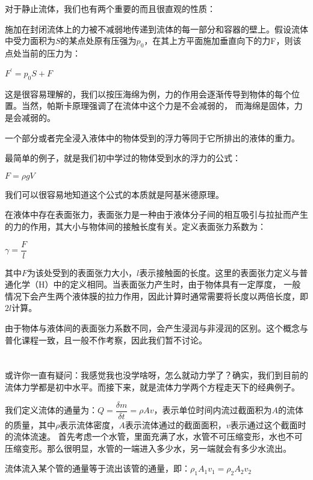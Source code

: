         对于静止流体，我们也有两个重要的而且很直观的性质：
        \begin{law}
            施加在封闭流体上的力被不减弱地传递到流体的每一部分和容器的壁上。假设流体中受力面积为$S$的某点处原有压强为$p_0$，在其上方平面施加垂直向下的力F，则该点处当前的压力为：
            \begin{center}
                $F^{'}=p_0 S +F$
            \end{center}
        \end{law}

        这是很容易理解的，我们以按压海绵为例，力的作用会逐渐传导到物体的每个位置。当然，帕斯卡原理强调了在流体中这个力是不会减弱的，
        而海绵是固体，力是会减弱的。
        \begin{law}
            一个部分或者完全浸入液体中的物体受到的浮力等同于它所排出的液体的重力。
        \end{law}

        最简单的例子，就是我们初中学过的物体受到水的浮力的公式：
        \begin{center}
            $F=\rho gV$
        \end{center}

        我们可以很容易地知道这个公式的本质就是阿基米德原理。

        在液体中存在表面张力，表面张力是一种由于液体分子间的相互吸引与拉扯而产生的力的作用，其大小与物体间的接触长度有关。定义表面张力系数为：
        \begin{center}
            $\gamma =\dfrac{F}{l}$
        \end{center}

        其中$F$为该处受到的表面张力大小，$l$表示接触面的长度。这里的表面张力定义与普通化学（H）中的定义相同。当表面张力产生时，由于物体具有一定厚度，
        一般情况下会产生两个液体膜的拉力作用，因此计算时通常需要将长度以两倍长度，即$2l$计算。

        由于物体与液体间的表面张力系数不同，会产生浸润与非浸润的区别。这个概念与普化课程一致，且一般不作考察，因此我们暂不讨论。
        \section[流体动力学]{}
        或许你一直有疑问：我感觉我也没学啥呀，怎么就动力学了？确实，我们到目前的流体力学都是初中水平。而接下来，就是流体力学两个方程走天下的经典例子。
        
        我们定义流体的通量为：$Q=\dfrac{\delta m}{\delta t}=\rho Av$，表示单位时间内流过截面积为$A$的流体的质量，其中$\rho$表示流体密度，$A$表示流体通过的截面面积，$v$表示通过这个截面时的流体流速。
        首先考虑一个水管，里面充满了水，水管不可压缩变形，水也不可压缩变形。那么很明显，水管的一端进入多少水，另一端就会有多少水流出。
        \begin{law}
            流体流入某个管的通量等于流出该管的通量，即：$\rho_1 A_1 v_1=\rho_2 A_2 v_2$
        \end{law}

